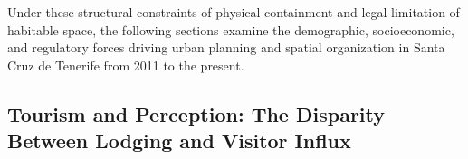 Under these structural constraints of physical containment and legal limitation of habitable space, the following sections examine the demographic, socioeconomic, and regulatory forces driving urban planning and spatial organization in Santa Cruz de Tenerife from 2011 to the present.

\subsection{Tourism and Perception: The Disparity Between Lodging and Visitor Influx}







